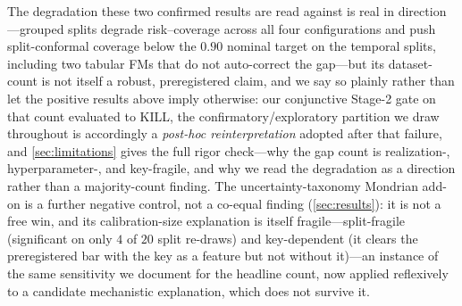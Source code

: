\documentclass[11pt]{article}
\begin{document}
The degradation these two confirmed results are read against is real in direction---grouped splits degrade
risk--coverage across all four configurations and push split-conformal coverage below the $0.90$ nominal
target on the temporal splits, including two tabular FMs that do not auto-correct the gap---but its
dataset-count is not itself a robust, preregistered claim, and we say so plainly rather than let the
positive results above imply otherwise: our conjunctive Stage-2 gate on that count evaluated to KILL, the
confirmatory/exploratory partition we draw throughout is accordingly a \emph{post-hoc reinterpretation}
adopted after that failure, and \cref{sec:limitations} gives the full rigor check---why the gap count is
realization-, hyperparameter-, and key-fragile, and why we read the degradation as a direction rather than a
majority-count finding. The uncertainty-taxonomy Mondrian add-on is a further negative control, not a
co-equal finding (\cref{sec:results}): it is not a free win, and its calibration-size explanation is itself
fragile---split-fragile (significant on only $4$ of $20$ split re-draws) and key-dependent (it clears the
preregistered bar with the key as a feature but not without it)---an instance of the same sensitivity we
document for the headline count, now applied reflexively to a candidate mechanistic explanation, which does
not survive it.
\end{document}
